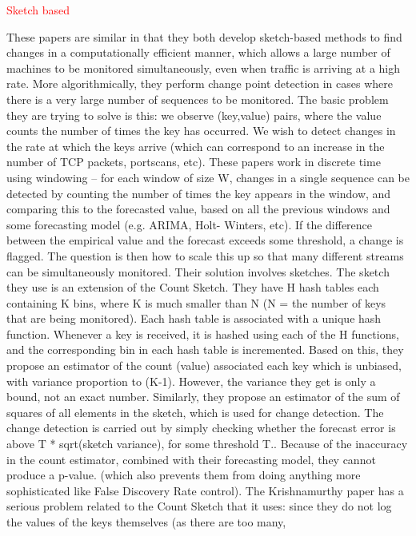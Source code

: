 \documentclass[a4paper,12pt,twoside]{report}
\begin{document}
\textcolor{red}{Sketch based}

These  papers  are  similar  in  that  they  both  develop  sketch-based  methods  to  find
changes in a computationally efficient manner, which allows a large number of machines
to  be  monitored  simultaneously,  even  when  traffic  is  arriving  at  a  high  rate.   More
algorithmically, they perform change point detection in cases where there is a very large
number of sequences to be monitored.
The basic problem they are trying to solve is this: we observe (key,value) pairs, where
the value counts the number of times the key has occurred.  We wish to detect changes
in the rate at which the keys arrive (which can correspond to an increase in the number
of TCP packets, portscans, etc).  These papers work in discrete time using windowing –
for each window of size W, changes in a single sequence can be detected by counting the
number of times the key appears in the window, and comparing this to the forecasted
value, based on all the previous windows and some forecasting model (e.g.  ARIMA, Holt-
Winters, etc).  If the difference between the empirical value and the forecast exceeds some
threshold, a change is flagged.  The question is then how to scale this up so that many
different streams can be simultaneously monitored.  Their solution involves sketches.
The sketch they use is an extension of the Count Sketch.  They have H hash tables
each containing K bins, where K is much smaller than N (N = the number of keys that are
being monitored).  Each hash table is associated with a unique hash function.  Whenever
a key is received, it is hashed using each of the H functions, and the corresponding bin
in  each  hash  table  is  incremented.   Based  on  this,  they  propose  an  estimator  of  the
count (value) associated each key which is unbiased, with variance proportion to (K-1).
However, the variance they get is only a bound, not an exact number.  Similarly, they
propose an estimator of the sum of squares of all elements in the sketch, which is used
for change detection.
The change detection is carried out by simply checking whether the forecast error is
above T * sqrt(sketch variance), for some threshold T..  Because of the inaccuracy in the
count estimator, combined with their forecasting model, they cannot produce a p-value.
(which also prevents them from doing anything more sophisticated like False Discovery
Rate control).
The Krishnamurthy paper has a serious problem related to the Count Sketch that
it uses:  since they do not log the values of the keys themselves (as there are too many,
\end{document}
